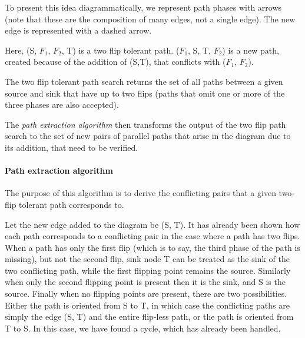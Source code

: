 \documentclass[sigplan,review,anonymous]{acmart}
\begin{document}
To present this idea diagrammatically, we represent path phases with arrows (note that these are the composition of many edges, not a single edge). The new edge is represented with a dashed arrow.

\begin{center}
\end{center}
Here, (S, $F_1$, $F_2$, T) is a two flip tolerant path. ($F_1$, S, T, $F_2$) is a new path, created because of the addition of (S,T), that conflicts with ($F_1$, $F_2$).

The two flip tolerant path search returns the set of all paths between a given source and sink that have up to two flips (paths that omit one or more of the three phases are also accepted).

The \textit{path extraction algorithm} then transforms the output of the two flip path search to the set of new pairs of parallel paths that arise in the diagram due to its addition, that need to be verified.

\paragraph{Path extraction algorithm}
The purpose of this algorithm is to derive the conflicting pairs that a given two-flip tolerant path corresponds to.

Let the new edge added to the diagram be (S, T).
It has already been shown how each path corresponds to a conflicting pair in the case where a path has two flips. When a path has only the first flip (which is to say, the third phase of the path is missing), but not the second flip, sink node T can be treated as the sink of the two conflicting path, while the first flipping point remains the source. Similarly when only the second flipping point is present then it is the sink, and S is the source. Finally when no flipping points are present, there are two possibilities. 
Either the path is oriented from S to T, in which case the conflicting paths are simply the edge (S, T) and the entire flip-less path, or the path is oriented from T to S. In this case, we have found a cycle, which has already been handled.
\end{document}
